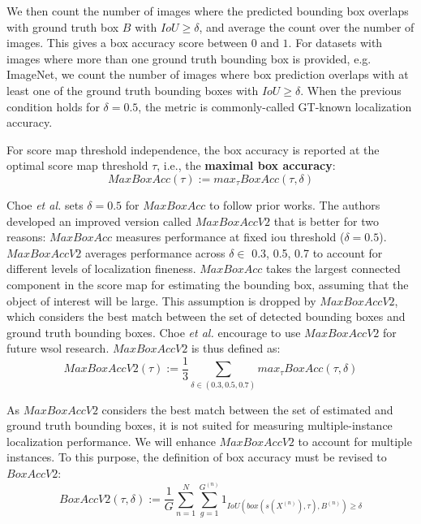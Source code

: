 We then count the number of images where the predicted bounding box overlaps with ground truth box $B$ with $IoU \ge \delta$, and average the count over the number of images. This gives a box accuracy score between $0$ and $1$. For datasets with images where more than one ground truth bounding box is provided, e.g. ImageNet, we count the number of images where box prediction overlaps with at least one of the ground truth bounding boxes with $IoU \ge \delta$. When the previous condition holds for $\delta = 0.5$, the metric is commonly-called GT-known localization accuracy.

For score map threshold independence, the box accuracy is reported at the optimal score map threshold $\tau$, i.e., the \textbf{maximal box accuracy}:
\begin{equation}
    MaxBoxAcc(\tau) := max_{\tau} BoxAcc(\tau,\delta)
\end{equation}

Choe \textit{et al.} \cite{choe2020evaluating} sets $\delta = 0.5$ for $MaxBoxAcc$ to follow prior works. The authors developed an improved version called $MaxBoxAccV2$ that is better for two reasons: $MaxBoxAcc$ measures performance at fixed \acrshort{iou} threshold ($\delta = 0.5$). $MaxBoxAccV2$ averages performance across $\delta \in$ {0.3, 0.5, 0.7} to account for different levels of localization fineness. $MaxBoxAcc$ takes the largest connected component in the score map for estimating the bounding box, assuming that the object of interest will be large. This assumption is dropped by $MaxBoxAccV2$, which considers the best match between the set of detected bounding boxes and ground truth bounding boxes. Choe \textit{et al.} encourage to use $MaxBoxAccV2$ for future \acrshort{wsol} research. $MaxBoxAccV2$ is thus defined as:
\begin{equation} \label{eq:maxboxaccv2}
    MaxBoxAccV2(\tau) := \frac{1}{3} \sum_{\delta \in (0.3,0.5,0.7)} max_{\tau} BoxAcc(\tau,\delta)
\end{equation}

As $MaxBoxAccV2$ considers the best match between the set of estimated and ground truth bounding boxes, it is not suited for measuring multiple-instance localization performance. We will enhance $MaxBoxAccV2$ to account for multiple instances. To this purpose, the definition of box accuracy must be revised to $BoxAccV2$:
\begin{equation} \label{eq:boxaccv2}
    BoxAccV2(\tau,\delta) := \frac{1}{G} \sum^{N}_{n=1} \sum^{G^{(n)}}_{g=1}  1_{IoU(box(s(X^{(n)}),\tau),B^{(n)})\ge\delta}
\end{equation}

